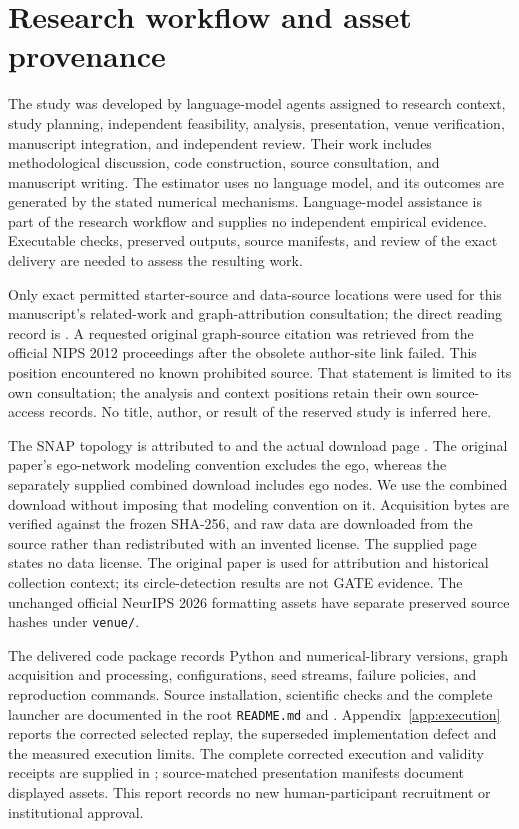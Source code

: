 \section{Research workflow and asset provenance}
\label{app:workflow}
The study was developed by language-model agents assigned to research context, study planning, independent feasibility, analysis, presentation, venue verification, manuscript integration, and independent review. Their work includes methodological discussion, code construction, source consultation, and manuscript writing. The estimator uses no language model, and its outcomes are generated by the stated numerical mechanisms. Language-model assistance is part of the research workflow and supplies no independent empirical evidence. Executable checks, preserved outputs, source manifests, and review of the exact delivery are needed to assess the resulting work.

Only exact permitted starter-source and data-source locations were used for this manuscript's related-work and graph-attribution consultation; the direct reading record is . A requested original graph-source citation was retrieved from the official NIPS 2012 proceedings after the obsolete author-site link failed. This position encountered no known prohibited source. That statement is limited to its own consultation; the analysis and context positions retain their own source-access records. No title, author, or result of the reserved study is inferred here.

The SNAP topology is attributed to \citet{mcauley2012} and the actual download page \citep{snapFacebook}. The original paper's ego-network modeling convention excludes the ego, whereas the separately supplied combined download includes ego nodes. We use the combined download without imposing that modeling convention on it. Acquisition bytes are verified against the frozen SHA-256, and raw data are downloaded from the source rather than redistributed with an invented license. The supplied page states no data license. The original paper is used for attribution and historical collection context; its circle-detection results are not GATE evidence. The unchanged official NeurIPS 2026 formatting assets have separate preserved source hashes under \texttt{venue/}.

The delivered code package records Python and numerical-library versions, graph acquisition and processing, configurations, seed streams, failure policies, and reproduction commands. Source installation, scientific checks and the complete launcher are documented in the root \texttt{README.md} and . Appendix~\ref{app:execution} reports the corrected selected replay, the superseded implementation defect and the measured execution limits. The complete corrected execution and validity receipts are supplied in ; source-matched presentation manifests document displayed assets. This report records no new human-participant recruitment or institutional approval.
